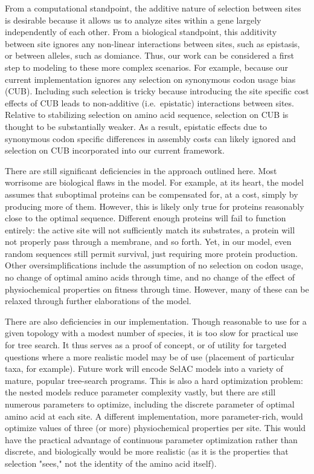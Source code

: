 \documentclass{article}
\newcommand{\selac}{SelAC\xspace}
\begin{document}
From a computational standpoint, the additive nature of selection between sites is desirable because it allows us to analyze sites within a gene largely independently of each other.
From a biological standpoint, this additivity between site ignores any non-linear interactions between sites, such as epistasis, or between alleles, such as domiance.  
Thus, our work can be considered a first step to modeling to these more complex scenarios. 
For example, because our current implementation ignores any selection on synonymous codon usage bias (CUB).
Including such selection is tricky because introducing the site specific cost effects of CUB leads to non-additive (i.e.~epistatic) interactions between sites. 
Relative to stabilizing selection on amino acid sequence, selection on CUB is thought to be substantially weaker.
As a result, epistatic effects due to synonymous codon specific differences in assembly costs can likely ignored and selection on CUB incorporated into our current framework.

There are still significant deficiencies in the approach outlined here.
Most worrisome are biological flaws in the model.
For example, at its heart, the model assumes that suboptimal proteins can be compensated for, at a cost, simply by producing more of them.
However, this is likely only true for proteins reasonably close to the optimal sequence.
Different enough proteins will fail to function entirely: the active site will not sufficiently match its substrates, a protein will not properly pass through a membrane, and so forth.
Yet, in our model, even random sequences still permit survival, just requiring more protein production.
Other oversimplifications include the assumption of no selection on codon usage, no change of optimal amino acids through time, and no change of the effect of physiochemical properties on fitness through time.
However, many of these can be relaxed through further elaborations of the model.

There are also deficiencies in our implementation.
Though reasonable to use for a given topology with a modest number of species, it is too slow for practical use for tree search.
It thus serves as a proof of concept, or of utility for targeted questions where a more realistic model may be of use (placement of particular taxa, for example).
Future work will encode \selac models into a variety of mature, popular tree-search programs.
This is also a hard optimization problem: the nested models reduce parameter complexity vastly, but there are still numerous parameters to optimize, including the discrete parameter of optimal amino acid at each site.
A different implementation, more parameter-rich, would optimize values of three (or more) physiochemical properties per site.
This would have the practical advantage of continuous parameter optimization rather than discrete, and biologically would be more realistic (as it is the properties that selection "sees," not the identity of the amino acid itself).
\end{document}
